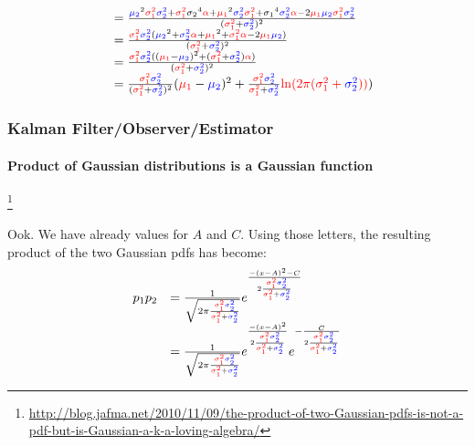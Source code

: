 \begin{frame}[plain]
\begin{changemargin}{-1.35in}{0in}
\begin{equation*}
\begin{array}{rlllllll}
&=\frac  {      {\mutwo}^2 \varone \vartwo + \varone {\stwo}^4 {\color{red}\alpha} + {\muone}^2 \vartwo \varone + {\sone}^4 \vartwo {\color{red}\alpha} - 2{\muone}{\mutwo} \varone \vartwo  }  {      (\varone + \vartwo)^2  }\\
&=\frac  {      \varone \vartwo ( {\mutwo}^2 + \vartwo {\color{red}\alpha} + {\muone}^2 + \varone {\color{red}\alpha} - 2{\muone}{\mutwo} )  }   {      (\varone + \vartwo)^2  }\\
&=\frac  {      \varone \vartwo ( ( {\muone} - {\mutwo} )^2 + (\varone + \vartwo) {\color{red}\alpha} )  }   {      (\varone + \vartwo)^2  }\\
&=\frac { \varone \vartwo }{ (\varone + \vartwo)^2 } ({\muone} - {\mutwo} )^2+\frac { \varone \vartwo }{ \varone + \vartwo } \myalpha )\\
\end{array}
\end{equation*}
\end{changemargin}
\end{frame}




\begin{frame}[plain]
\frametitle{Kalman Filter/Observer/Estimator}
\framesubtitle{Product of Gaussian distributions is a Gaussian function}

\footnote{\tiny\hspace{-0.23in} \hspace{-0.25in}
\href{http://blog.jafma.net/2010/11/09/the-product-of-two-Gaussian-pdfs-is-not-a-pdf-but-is-Gaussian-a-k-a-loving-algebra/}{http://blog.jafma.net/2010/11/09/the-product-of-two-Gaussian-pdfs-is-not-a-pdf-but-is-Gaussian-a-k-a-loving-algebra/}}
\begin{changemargin}{-1.35in}{0in}
\scriptsize
Ook. We have already values for $A$ and $C$. Using those letters, the resulting product of the two Gaussian pdfs has become:
\begin{equation*}
\begin{array}{rlllllll}
p_1p_2&=    \frac{1}{\sqrt{2 \pi \frac { \varone \vartwo }{\varone + \vartwo} }}    e^{ \frac{-(x-A)^2-C}{2 \frac{\varone \vartwo}{\varone + \vartwo}} } \\
&=    \frac{1}{\sqrt{2 \pi \frac { \varone \vartwo }{\varone + \vartwo} }}    e^{ \frac{-(x-A)^2}{2 \frac{\varone \vartwo}{\varone + \vartwo}} }   e^{- \frac {C}{2 \frac{\varone \vartwo}{\varone + \vartwo}} }
\end{array}
\end{equation*}
\end{changemargin}
\end{frame}




